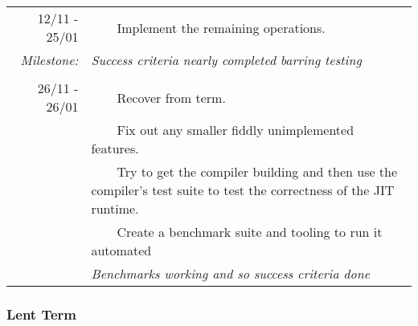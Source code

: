 \documentclass[12pt,a4paper, headings=standardclasses]{scrartcl}
\newcommand{\tabitem}{~~\llap{\textbullet}~~}
\begin{document}
\begin{tabularx}{\textwidth}{rX}
    12/11 - 25/01
          & \tabitem Implement the remaining operations.                                                                       \\
    \textit{Milestone:}
          & \textit{Success criteria nearly completed barring testing}                                                         \\

          &                                                                                                                    \\

    26/11 - 26/01
          & \tabitem Recover from term.                                                                                        \\
          & \tabitem Fix out any smaller fiddly unimplemented features.                                                        \\
          & \tabitem Try to get the compiler building and then use the
    compiler's test suite to test the correctness of the JIT runtime.                                                          \\
          & \tabitem Create a benchmark suite and tooling to run it automated                                                  \\
          & \textit{Benchmarks working and so success criteria done}                                                           \\
    \bottomrule
\end{tabularx}

\subsubsection*{Lent Term}
\end{document}
